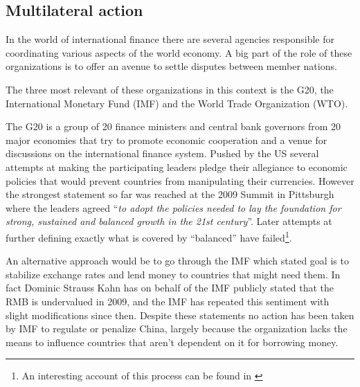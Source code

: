 


\subsection{Multilateral action}

In the world of international finance there are several agencies 
responsible for coordinating various aspects of the world economy. A big 
part of the role of these organizations is to offer an avenue to settle 
disputes between member nations. %

The three most relevant of these organizations in this context is the 
G20, the International Monetary Fund (IMF) and the World Trade 
Organization (WTO).

The G20 is a group of 20 finance ministers and central bank governors 
from 20 major economies that try to promote economic cooperation and a 
venue for discussions on the international finance system. Pushed by the 
US several attempts at making the participating leaders pledge their 
allegiance to economic policies that would prevent countries from 
manipulating their currencies. However the strongest statement so far 
was reached at the 2009 Summit in Pittsburgh where the leaders agreed 
``\textit{to adopt the policies needed to lay the foundation for strong, 
sustained and balanced growth in the 21st century}''. Later attempts at 
further defining exactly what is covered by ``balanced'' have 
failed\footnote{An interesting account of this process can be found in 
\cite{Levy11}}.

An alternative approach would be to go through the IMF which stated goal 
is to stabilize exchange rates and lend money to countries that might 
need them. In fact Dominic Strauss Kahn has on behalf of the IMF 
publicly stated that the RMB is undervalued in 2009, and the IMF has 
repeated this sentiment with slight modifications since 
then\cite{reuters09}.  Despite these statements no action has been taken 
by IMF to regulate or penalize China, largely because the organization 
lacks the means to influence countries that aren't dependent on it for 
borrowing money.

